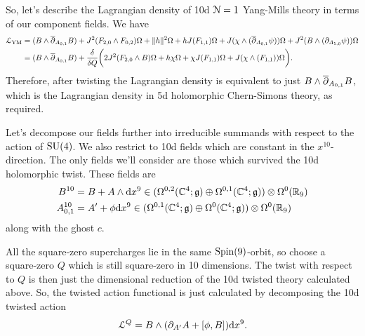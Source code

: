 \documentclass[10pt, oneside]{article}
\renewcommand{\d}{\mathrm{d}}
\begin{document}
\begin{example}[10d $\mc N=1$ Super Yang-Mills]
So, let's describe the Lagrangian density of 10d $\mc N=1$ Yang-Mills theory in terms of our component fields.  We have
\begin{align*}
\mathcal{L}_{\mathrm{YM}} &= (B \wedge \overline{\partial}_{A_{0,1}} B) + J^2(F_{2, 0}\wedge F_{0,2})\Omega + \|h\|^2\Omega + h J(F_{1,1}) \Omega + J( \chi \wedge (\overline{\partial}_{A_{0,1}} \psi)) \Omega + J^2(B \wedge (\partial_{A_{1,0}} \psi)) \Omega \\
&= (B \wedge \overline{\partial}_{A_{0,1}} B) + \frac\delta{\delta Q}\bigg( 2J^2(F_{2, 0}\wedge B)\Omega + h\chi\Omega + \chi J(F_{1,1}) \Omega + J( \chi \wedge (F_{1,1})) \Omega\bigg).
\end{align*}
Therefore, after twisting the Lagrangian density is equivalent to just $B \wedge \overline{\partial}_{A_{0,1}} B$, which is the Lagrangian density in 5d holomorphic Chern-Simons theory, as required.
\end{example}

\begin{example}[9d $\mc N=1$ Super Yang-Mills]
Let's decompose our fields further into irreducible summands with respect to the action of $\mathrm{SU}(4)$.  We also restrict to 10d fields which are constant in the $x^{10}$-direction.  The only fields we'll consider are those which survived the 10d holomorphic twist.  These fields are
\begin{align*}
B^{10} &= B + A \wedge \d x^9 \in (\Omega^{0,2}(\CC^4; \gg) \oplus \Omega^{0,1}(\CC^4; \gg)) \otimes \Omega^0(\RR_9) \\
A^{10}_{0,1} &= A' + \phi \d x^9 \in (\Omega^{0,1}(\CC^4; \gg) \oplus \Omega^0(\CC^4; \gg)) \otimes \Omega^0(\RR_9)
\end{align*}
along with the ghost $c$.

All the square-zero supercharges lie in the same $\mathrm{Spin}(9)$-orbit, so choose a square-zero $Q$ which is still square-zero in 10 dimensions.  The twist with respect to $Q$ is then just the dimensional reduction of the 10d twisted theory calculated above.  So, the twisted action functional is just calculated by decomposing the 10d twisted action
\[\LL^Q = B \wedge (\dd_{A'} A + [\phi, B]) \d x^9.\]
\end{example}
\end{document}
